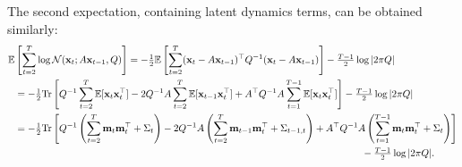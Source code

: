 \documentclass[10pt]{article}
\newcommand{\vx}{\mathbf{x}}
\newcommand{\vm}{\mathbf{m}}
\begin{document}
The second expectation, containing latent dynamics terms, can be obtained similarly:
\begin{align}
\E &\left[ \sum_{t=2}^{T} \log \Nrm(\vx_{t};
                  A\vx_{t-1} ,  Q) \right]  =  - \tonehlf \E\left[ \sum_{t=2}^{T} (\vx_{t} - A
           \vx_{t-1})\trp Q\inv (\vx_{t} - A\vx_{t-1}) \right]  -\tfrac{T-1}{2} \log
           |2\pi Q| \nonumber \\
           &= - \tonehlf \Tr  \left[Q\inv
             \sum_{t=2}^T \E [ \vx_t \vx_t\trp ]  - 2 Q\inv A
             \sum_{t=2}^T \E[ \vx_{t-1} \vx_t\trp] 
             +  A\trp Q\inv A \sum_{t=1}^{T-1} \E[\vx_t \vx_t\trp]
             \right] -\tfrac{T-1}{2} \log |2\pi Q| 
             \nonumber
  \\
  &= -\tonehlf \Tr \left[Q\inv \left(\sum_{t=2}^T \vm_t \vm_t\trp +
    \Sigma_t \right)  -2Q\inv A \left(
           \sum_{t=2}^T \vm_{t-1} \vm_t\trp +
    \Sigma_{t-1,t} \right) 
+ A\trp Q\inv A \left(\sum_{t=1}^{T-1} \vm_t \vm_t\trp + \Sigma_t
    \right) \right] \nonumber \\
  & \hspace{4.9in}
  -\tfrac{T-1}{2} \log |2\pi Q|.
\end{align}
\end{document}
